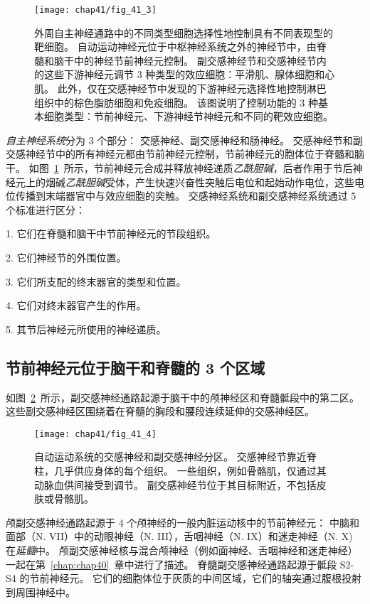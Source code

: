 \begin{figure}[htbp]
	\centering
	\texttt{[image: chap41/fig\_41\_3]}
	\caption{外周自主神经通路中的不同类型细胞选择性地控制具有不同表现型的靶细胞。
		自动运动神经元位于中枢神经系统之外的神经节中，由脊髓和脑干中的神经节前神经元控制。
		副交感神经节和交感神经节内的这些下游神经元调节 3 种类型的效应细胞：平滑肌、腺体细胞和心肌。
		此外，仅在交感神经节中发现的下游神经元选择性地控制淋巴组织中的棕色脂肪细胞和免疫细胞。
		该图说明了控制功能的 3 种基本细胞类型：节前神经元、下游神经节神经元和不同的靶效应细胞。}
	\label{fig:41_3}
\end{figure}


\textit{自主神经系统}分为 3 个部分：
交感神经、副交感神经和肠神经。
交感神经节和副交感神经节中的所有神经元都由节前神经元控制，节前神经元的胞体位于脊髓和脑干。
如图~\ref{fig:41_3}~所示，节前神经元合成并释放神经递质\textit{乙酰胆碱}，后者作用于节后神经元上的烟碱\textit{乙酰胆碱}受体，产生快速兴奋性突触后电位和起始动作电位，这些电位传播到末端器官中与效应细胞的突触。
交感神经系统和副交感神经系统通过 5 个标准进行区分：

1. 它们在脊髓和脑干中节前神经元的节段组织。

2. 它们神经节的外围位置。

3. 它们所支配的终末器官的类型和位置。

4. 它们对终末器官产生的作用。

5. 其节后神经元所使用的神经递质。



\subsection{节前神经元位于脑干和脊髓的 3 个区域}

如图~\ref{fig:41_4}~所示，副交感神经通路起源于脑干中的颅神经区和脊髓骶段中的第二区。
这些副交感神经区围绕着在脊髓的胸段和腰段连续延伸的交感神经区。


\begin{figure}[htbp]
	\centering
	\texttt{[image: chap41/fig\_41\_4]}
	\caption{自动运动系统的交感神经和副交感神经分区。
		交感神经节靠近脊柱，几乎供应身体的每个组织。
		一些组织，例如骨骼肌，仅通过其动脉血供间接受到调节。
		副交感神经节位于其目标附近，不包括皮肤或骨骼肌。}
	\label{fig:41_4}
\end{figure}


颅副交感神经通路起源于 4 个颅神经的一般内脏运动核中的节前神经元：
中脑和面部（N. VII）中的动眼神经（N. III），舌咽神经（N. IX）和迷走神经（N. X) 在\textit{延髓}中。
颅副交感神经核与混合颅神经（例如面神经、舌咽神经和迷走神经）一起在第~\ref{chap:chap40}~章中进行了描述。
脊髓副交感神经通路起源于骶段 S2-S4 的节前神经元。
它们的细胞体位于灰质的中间区域，它们的轴突通过腹根投射到周围神经中。


